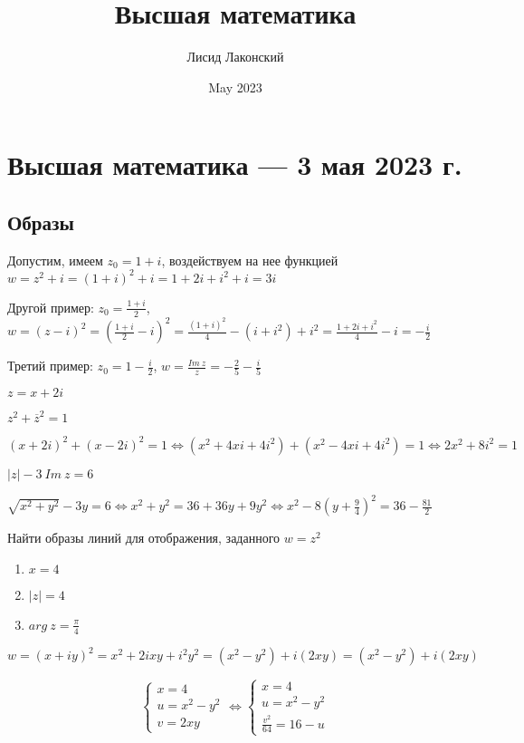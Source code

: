 \documentclass{article}
\title{Высшая математика}
\author{Лисид Лаконский}
\date{May 2023}
\begin{document}
\raggedright

\maketitle

\tableofcontents
\pagebreak

\section{Высшая математика — 3 мая 2023 г.}

\subsection{Образы}

Допустим, имеем $z_0 = 1 + i$, воздействуем на нее функцией $w = z^2 + i = (1 + i)^2 + i = 1 + 2 i + i^2 + i = 3 i$

Другой пример: $z_0 = \frac{1 + i}{2}$, $w = (z - i)^2 = (\frac{1 + i}{2} - i)^2 = \frac{(1 + i)^2}{4} - (i + i^2) + i^2 = \frac{1 + 2 i + i^2}{4} - i = -\frac{i}{2}$

Третий пример: $z_0 = 1 - \frac{i}{2}$, $w = \frac{Im \ z}{z} = -\frac{2}{5} - \frac{i}{5}$

\hfill

$z = x + 2 i$

$z^2 + \overline{z}^{2} = 1$

$(x + 2 i)^2 + (x - 2 i)^2 = 1 \Longleftrightarrow (x^2 + 4x i + 4i^2) + (x^2 - 4 x i + 4 i ^2) = 1 \Longleftrightarrow 2 x^2 + 8 i ^2 = 1$

\hfill

$|z| - 3 \ Im \ z = 6$

$\sqrt{x^2 + y^2} - 3 y = 6 \Longleftrightarrow x^2 + y^2 = 36 + 36 y + 9 y^2 \Longleftrightarrow x^2 - 8 (y + \frac{9}{4})^2 = 36 - \frac{81}{2}$

\hfill

Найти образы линий для отображения, заданного $w = z^2$

\begin{enumerate}
    \item $x = 4$
    \item $|z| = 4$
    \item $arg \ z = \frac{\pi}{4}$
\end{enumerate}

$w = (x + i y)^2 = x^2 + 2 i x y + i^2 y^2 = (x^2 - y^2) + i (2 x y) = (x^2 - y^2) + i (2 x y)$

$$
\begin{cases}
    x = 4 \\
    u = x^2 - y^2 \\
    v = 2 x y
\end{cases} \Longleftrightarrow \begin{cases}
    x = 4 \\
    u = x^2 - y^2 \\
    \frac{v^2}{64} = 16 - u
\end{cases}
$$
\end{document}
